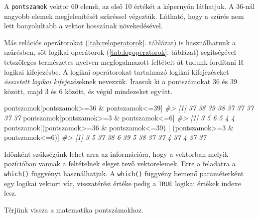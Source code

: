 \documentclass[
]{book}
\newenvironment{Shaded}{\begin{snugshade}}{\end{snugshade}}
\newcommand{\CommentTok}[1]{\textcolor[rgb]{0.56,0.35,0.01}{\textit{#1}}}
\newcommand{\DecValTok}[1]{\textcolor[rgb]{0.00,0.00,0.81}{#1}}
\newcommand{\NormalTok}[1]{#1}
\newcommand{\SpecialCharTok}[1]{\textcolor[rgb]{0.00,0.00,0.00}{#1}}
\begin{document}
A \texttt{pontszamok} vektor 60 elemű, az első 10 értékét a képernyőn láthatjuk. A 36-nál nagyobb elemek megjelenítését szűréssel végeztük. Látható, hogy a szűrés nem lett bonyolultabb a vektor hosszának növekedésével.

Más relációs operátorokat (\ref{tab:reloperatorok}. táblázat) is használhatunk a szűrésben, sőt logikai operátorok (\ref{tab:logoperatorok}. táblázat) segítségével tetszőleges természetes nyelven megfogalmazott feltételt át tudunk fordítani R logikai kifejezésbe. A logikai operátorokat tartalmazó logikai kifejezéseket \emph{összetett logikai kifejezés}eknek nevezzük. Írassuk ki a pontszámokat 36 és 39 között, majd 3 és 6 között, és végül mindezeket együtt.

\begin{Shaded}
\begin{Highlighting}[]
\NormalTok{pontszamok[pontszamok}\SpecialCharTok{\textgreater{}=}\DecValTok{36} \SpecialCharTok{\&}\NormalTok{ pontszamok}\SpecialCharTok{\textless{}=}\DecValTok{39}\NormalTok{]}
\CommentTok{\#\textgreater{} [1] 37 38 39 38 37 37 37 37 37}
\NormalTok{pontszamok[pontszamok}\SpecialCharTok{\textgreater{}=}\DecValTok{3} \SpecialCharTok{\&}\NormalTok{ pontszamok}\SpecialCharTok{\textless{}=}\DecValTok{6}\NormalTok{]}
\CommentTok{\#\textgreater{} [1] 3 5 6 5 4 4}
\NormalTok{pontszamok[(pontszamok}\SpecialCharTok{\textgreater{}=}\DecValTok{36} \SpecialCharTok{\&}\NormalTok{ pontszamok}\SpecialCharTok{\textless{}=}\DecValTok{39}\NormalTok{) }\SpecialCharTok{|}\NormalTok{ (pontszamok}\SpecialCharTok{\textgreater{}=}\DecValTok{3} \SpecialCharTok{\&}\NormalTok{ pontszamok}\SpecialCharTok{\textless{}=}\DecValTok{6}\NormalTok{)]}
\CommentTok{\#\textgreater{}  [1]  3  5 37 38  6 39  5 38 37 37  4 37  4 37 37}
\end{Highlighting}
\end{Shaded}

Időnként szükségünk lehet arra az információra, hogy a vektorban melyik pozícióban vannak a feltételnek eleget tevő vektorelemek. Erre a feladatra a \texttt{which()} függvényt használhatjuk. A \texttt{which()} függvény bemenő paraméterként egy logikai vektort vár, visszatérési értéke pedig a \texttt{TRUE} logikai értékek indexe lesz.

Térjünk vissza a matematika pontszámokhoz.
\end{document}
